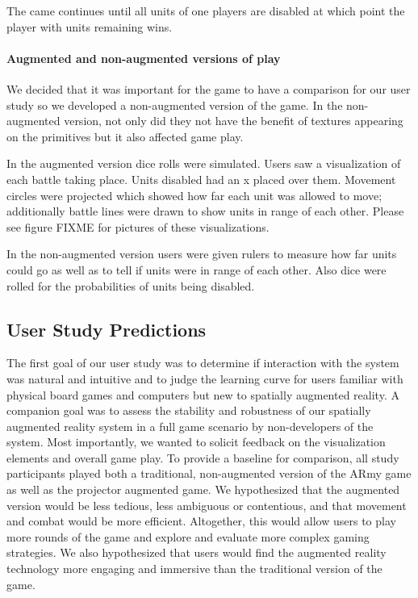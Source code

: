The came continues until all units of one players are disabled at which point the player with units remaining wins.

\paragraph{Augmented and non-augmented versions of play}

We decided that it was important for the game to have a comparison for our user study so we developed a non-augmented version of the game.  In the non-augmented version, not only did they not have the benefit of textures appearing on the primitives but it also affected game play.

In the augmented version dice rolls were simulated.  Users saw a visualization of each battle taking place.  Units disabled had an x placed over them.   Movement circles were projected which showed how far each unit was allowed to move; additionally battle lines were drawn to show units in range of each other.  Please see figure FIXME for pictures of these visualizations.

In the non-augmented version users were given rulers to measure how far units could go as well as to tell if units were in range of each other.  Also dice were rolled for the probabilities of units being disabled.

\subsection{User Study Predictions}


The first goal of our user study was to determine if interaction with
the system was natural and intuitive and to judge the learning curve
for users familiar with physical board games and computers but new to
spatially augmented reality.  A companion goal was to assess the
stability and robustness of our spatially augmented reality system in
a full game scenario by non-developers of the system.  Most
importantly, we wanted to solicit feedback on the visualization
elements and overall game play.  To provide a baseline for comparison,
all study participants played both a traditional, non-augmented
version of the ARmy game as well as the projector augmented game.  We
hypothesized that the augmented version would be less tedious, less
ambiguous or contentious, and that movement and combat would be more
efficient.  Altogether, this would allow users to play more rounds of
the game and explore and evaluate more complex gaming strategies.
We also hypothesized that users would find the augmented reality
technology more engaging and immersive than the traditional version of
the game.

